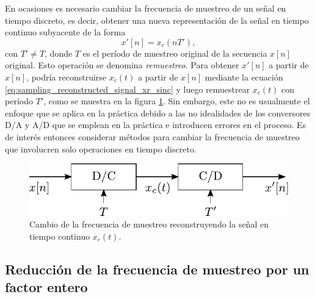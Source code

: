 \documentclass[a4paper]{report}
\begin{document}
En ocasiones es necesario cambiar la frecuencia de muestreo de un señal en tiempo discreto, es decir, obtener una nueva representación de la señal en tiempo continuo subyacente de la forma
\[
 x'[n]=x_c(nT'),
\]
con \(T'\neq T\), donde \(T\) es el período de muestreo original de la secuencia \(x[n]\) original. Esto operación se denomina \emph{remuestreo}. Para obtener \(x'[n]\) a partir de \(x[n]\), podría reconstruirse \(x_c(t)\) a partir de \(x[n]\) mediante la ecuación \ref{eq:sampling_reconstructed_signal_xr_sinc} y luego remuestrear \(x_c(t)\) con período \(T'\), como se muestra en la figura \ref{fig:sampling_change_sampling_rate_with_reconstruction}. Sin embargo, este no es usualmente el enfoque que se aplica en la práctica debido a las no idealidades de los conversores D/A y A/D que se emplean en la práctica e introducen errores en el proceso. Es de interés entonces considerar métodos para cambiar la frecuencia de muestreo que involucren solo operaciones en tiempo discreto.
\begin{figure}[!htb]
 \begin{minipage}[c]{0.47\textwidth}
  \includegraphics[width=\textwidth]{figuras/sampling_change_sampling_rate_with_reconstruction.pdf}
 \end{minipage}\hfill
 \begin{minipage}[c]{0.43\textwidth}
 \caption{
   Cambio de la frecuencia de muestreo reconstruyendo la señal en tiempo continuo \(x_c(t)\).
  }\label{fig:sampling_change_sampling_rate_with_reconstruction}
 \end{minipage}
\end{figure}


\subsection{Reducción de la frecuencia de muestreo por un factor entero}
\end{document}
